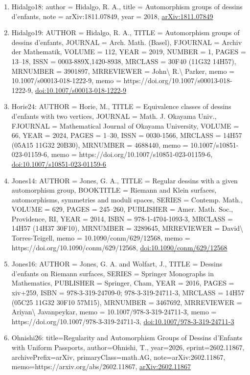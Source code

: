 \documentclass[11pt]{article}
\begin{document}
\begin{enumerate}[leftmargin=*]
  \item Hidalgo18: author = Hidalgo, R. A., title = Automorphism groups of dessins d'enfants, note = arXiv:1811.07849, year = 2018, \href{https://arxiv.org/abs/1811.07849}{arXiv:1811.07849}
  \item Hidalgo19: AUTHOR = Hidalgo, R. A., TITLE = Automorphism groups of dessins d'enfants, JOURNAL = Arch. Math. (Basel), FJOURNAL = Archiv der Mathematik, VOLUME = 112, YEAR = 2019, NUMBER = 1, PAGES = 13--18, ISSN = 0003-889X,1420-8938, MRCLASS = 30F40 (11G32 14H57), MRNUMBER = 3901897, MRREVIEWER = John\textbackslash{} R.\textbackslash{} Parker, memo = 10.1007/s00013-018-1222-9, memo = https://doi.org/10.1007/s00013-018-1222-9, \href{https://doi.org/10.1007/s00013-018-1222-9}{doi:10.1007/s00013-018-1222-9}
  \item Horie24: AUTHOR = Horie, M., TITLE = Equivalence classes of dessins d'enfants with two vertices, JOURNAL = Math. J. Okayama Univ., FJOURNAL = Mathematical Journal of Okayama University, VOLUME = 66, YEAR = 2024, PAGES = 1--30, ISSN = 0030-1566, MRCLASS = 14H57 (05A15 11G32 20B30), MRNUMBER = 4688440, memo = 10.1007/s10851-023-01159-6, memo = https://doi.org/10.1007/s10851-023-01159-6, \href{https://doi.org/10.1007/s10851-023-01159-6}{doi:10.1007/s10851-023-01159-6}
  \item Jones14: AUTHOR = Jones, G. A., TITLE = Regular dessins with a given automorphism group, BOOKTITLE = Riemann and Klein surfaces, automorphisms, symmetries and moduli spaces, SERIES = Contemp. Math., VOLUME = 629, PAGES = 245--260, PUBLISHER = Amer. Math. Soc., Providence, RI, YEAR = 2014, ISBN = 978-1-4704-1093-3, MRCLASS = 14H57 (14H37 30F10), MRNUMBER = 3289645, MRREVIEWER = David\textbackslash{} Torres-Teigell, memo = 10.1090/conm/629/12568, memo = https://doi.org/10.1090/conm/629/12568, \href{https://doi.org/10.1090/conm/629/12568}{doi:10.1090/conm/629/12568}
  \item Jones16: AUTHOR = Jones, G. A. and Wolfart, J., TITLE = Dessins d'enfants on Riemann surfaces, SERIES = Springer Monographs in Mathematics, PUBLISHER = Springer, Cham, YEAR = 2016, PAGES = xiv+259, ISBN = 978-3-319-24709-0; 978-3-319-24711-3, MRCLASS = 14H57 (05C25 11G32 30F10 57M15), MRNUMBER = 3467692, MRREVIEWER = Ariyan\textbackslash{} Javanpeykar, memo = 10.1007/978-3-319-24711-3, memo = https://doi.org/10.1007/978-3-319-24711-3, \href{https://doi.org/10.1007/978-3-319-24711-3}{doi:10.1007/978-3-319-24711-3}
  \item Ohnishi26: title=Regularity and Automorphism Groups of Dessins d'Enfants with Uniform Passports, author=Ohnishi, T., year=2026, eprint=2602.11867, archivePrefix=arXiv, primaryClass=math.AG, note=arXiv:2602.11867, memo=https://arxiv.org/abs/2602.11867, \href{https://arxiv.org/abs/2602.11867}{arXiv:2602.11867}

\end{enumerate}
\end{document}
